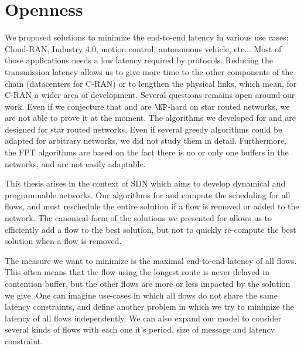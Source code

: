 \section*{Openness}

We proposed solutions to minimize the end-to-end latency in various use cases: Cloud-RAN, Industry 4.0, motion control, autonomous vehicle, etc... Most of those applications needs a low latency required by protocols. Reducing the transmission latency allows us to give more time to the other components of the chain (datacenters for C-RAN) or to lengthen the physical links, which mean, for C-RAN a wider area of development.
Several questions remains open around our work. Even if we conjecture that \pazl and \pall are $\NP$-hard on star routed networks, we are not able to prove it at the moment. 
The algorithms we developed for \pazl and \pall are designed for star routed networks. Even if several greedy algorithms could be adapted for arbitrary networks, we did not study them in detail. Furthermore, the FPT algorithms are based on the fact there is no or only one buffers in the networks, and are not easily adaptable.

This thesis arises in the context of SDN which aims to develop dynamical and programmable networks. Our algorithms for \pazl and \pall compute the scheduling for all flows, and must reschedule the entire solution if a flow is removed or added to the network. The canonical form of the solutions we presented for \minstra allows us to efficiently add a flow to the best solution, but not to quickly re-compute the best solution when a flow is removed.

The measure we want to minimize is the maximal end-to-end latency of all flows. This often means that the flow using the longest route is never delayed in contention buffer, but the other flows are more or less impacted by the solution we give. One can imagine use-cases in which all flows do not share the same latency constraints, and define another problem in which we try to minimize the latency of all flows independently. We can also expand our model to consider several kinds of flows with each one it's period, size of message and latency constraint. 



